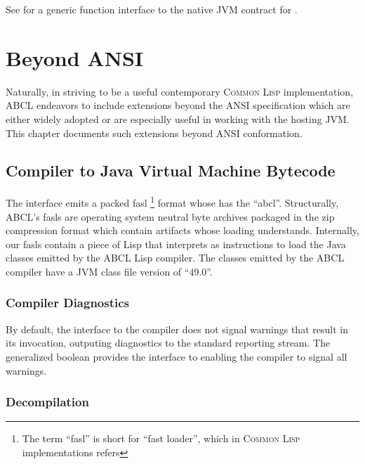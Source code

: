 \documentclass[10pt]{book}
\begin{document}
See \cite{RHODES2007} for a generic function interface to the native
\textsc{JVM} contract for .



\chapter{Beyond ANSI}
\label{chapter:beyond-ansi}

Naturally, in striving to be a useful contemporary \textsc{Common
  Lisp} implementation, \textsc{ABCL} endeavors to include extensions
beyond the ANSI specification which are either widely adopted or are
especially useful in working with the hosting \textsc{JVM}.  This
chapter documents such extensions beyond ANSI conformation.

\section{Compiler to Java Virtual Machine Bytecode}

The  interface emits a packed fasl \footnote{The
term ``fasl'' is short for ``fast loader'', which in \textsc{Common
  Lisp} implementations refers} format whose  has
the  ``abcl''.  Structurally, \textsc{ABCL}'s fasls are
operating system neutral byte archives packaged in the zip compression
format which contain artifacts whose loading 
understands.  Internally, our fasls contain a piece of Lisp that
 interprets as instructions to load the Java classes
emitted by the \textsc{ABCL} Lisp compiler.  The classes emitted by
the \textsc{ABCL} compiler have a JVM class file version of ``49.0''.


\subsection{Compiler Diagnostics}

By default, the interface to the compiler does not signal warnings
that result in its invocation, outputing diagnostics to the standard
reporting stream.  The generalized boolean
 provides the interface to
enabling the compiler to signal all warnings.

\subsection{Decompilation}
\end{document}
